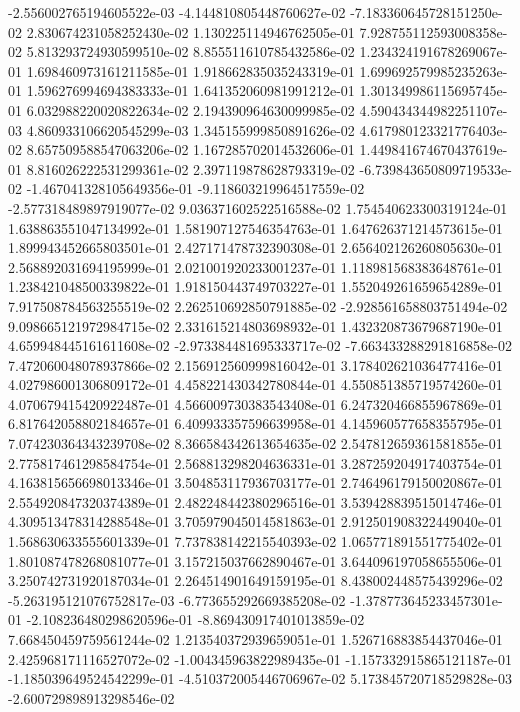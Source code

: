 -2.556002765194605522e-03
-4.144810805448760627e-02
-7.183360645728151250e-02
2.830674231058252430e-02
1.130225114946762505e-01
7.928755112593008358e-02
5.813293724930599510e-02
8.855511610785432586e-02
1.234324191678269067e-01
1.698460973161211585e-01
1.918662835035243319e-01
1.699692579985235263e-01
1.596276994694383333e-01
1.641352060981991212e-01
1.301349986115695745e-01
6.032988220020822634e-02
2.194390964630099985e-02
4.590434344982251107e-03
4.860933106620545299e-03
1.345155999850891626e-02
4.617980123321776403e-02
8.657509588547063206e-02
1.167285702014532606e-01
1.449841674670437619e-01
8.816026222531299361e-02
2.397119878628793319e-02
-6.739843650809719533e-02
-1.467041328105649356e-01
-9.118603219964517559e-02
-2.577318489897919077e-02
9.036371602522516588e-02
1.754540623300319124e-01
1.638863551047134992e-01
1.581907127546354763e-01
1.647626371214573615e-01
1.899943452665803501e-01
2.427171478732390308e-01
2.656402126260805630e-01
2.568892031694195999e-01
2.021001920233001237e-01
1.118981568383648761e-01
1.238421048500339822e-01
1.918150443749703227e-01
1.552049261659654289e-01
7.917508784563255519e-02
2.262510692850791885e-02
-2.928561658803751494e-02
9.098665121972984715e-02
2.331615214803698932e-01
1.432320873679687190e-01
4.659948445161611608e-02
-2.973384481695333717e-02
-7.663433288291816858e-02
7.472060048078937866e-02
2.156912560999816042e-01
3.178402621036477416e-01
4.027986001306809172e-01
4.458221430342780844e-01
4.550851385719574260e-01
4.070679415420922487e-01
4.566009730383543408e-01
6.247320466855967869e-01
6.817642058802184657e-01
6.409933357596639958e-01
4.145960577658355795e-01
7.074230364343239708e-02
8.366584342613654635e-02
2.547812659361581855e-01
2.775817461298584754e-01
2.568813298204636331e-01
3.287259204917403754e-01
4.163815656698013346e-01
3.504853117936703177e-01
2.746496179150020867e-01
2.554920847320374389e-01
2.482248442380296516e-01
3.539428839515014746e-01
4.309513478314288548e-01
3.705979045014581863e-01
2.912501908322449040e-01
1.568630633555601339e-01
7.737838142215540393e-02
1.065771891551775402e-01
1.801087478268081077e-01
3.157215037662890467e-01
3.644096197058655506e-01
3.250742731920187034e-01
2.264514901649159195e-01
8.438002448575439296e-02
-5.263195121076752817e-03
-6.773655292669385208e-02
-1.378773645233457301e-01
-2.108236480298620596e-01
-8.869430917401013859e-02
7.668450459759561244e-02
1.213540372939659051e-01
1.526716883854437046e-01
2.425968171116527072e-02
-1.004345963822989435e-01
-1.157332915865121187e-01
-1.185039649524542299e-01
-4.510372005446706967e-02
5.173845720718529828e-03
-2.600729898913298546e-02
